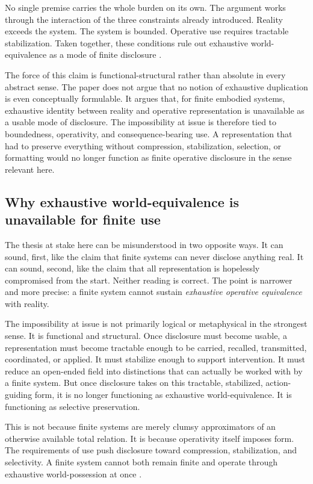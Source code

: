 \documentclass[11pt]{article}
\renewcommand{\emph}[1]{\textit{#1}}
\begin{document}
No single premise carries the whole burden on its own. The argument works through the interaction of the three constraints already introduced. Reality exceeds the system. The system is bounded. Operative use requires tractable stabilization. Taken together, these conditions rule out exhaustive world-equivalence as a mode of finite disclosure \cite{Wheeler2024BoundedRationalitySEP,ConantAshby1970GoodRegulator,Ashby1956IntroductionCybernetics}.

The force of this claim is functional-structural rather than absolute in every abstract sense. The paper does not argue that no notion of exhaustive duplication is even conceptually formulable. It argues that, for finite embodied systems, exhaustive identity between reality and operative representation is unavailable as a usable mode of disclosure. The impossibility at issue is therefore tied to boundedness, operativity, and consequence-bearing use. A representation that had to preserve everything without compression, stabilization, selection, or formatting would no longer function as finite operative disclosure in the sense relevant here.

\subsection{Why exhaustive world-equivalence is unavailable for finite use}

The thesis at stake here can be misunderstood in two opposite ways. It can sound, first, like the claim that finite systems can never disclose anything real. It can sound, second, like the claim that all representation is hopelessly compromised from the start. Neither reading is correct. The point is narrower and more precise: a finite system cannot sustain \emph{exhaustive operative equivalence} with reality.

The impossibility at issue is not primarily logical or metaphysical in the strongest sense. It is functional and structural. Once disclosure must become usable, a representation must become tractable enough to be carried, recalled, transmitted, coordinated, or applied. It must stabilize enough to support intervention. It must reduce an open-ended field into distinctions that can actually be worked with by a finite system. But once disclosure takes on this tractable, stabilized, action-guiding form, it is no longer functioning as exhaustive world-equivalence. It is functioning as selective preservation.

This is not because finite systems are merely clumsy approximators of an otherwise available total relation. It is because operativity itself imposes form. The requirements of use push disclosure toward compression, stabilization, and selectivity. A finite system cannot both remain finite and operate through exhaustive world-possession at once \cite{Simon1982ModelsBoundedRationality,ConantAshby1970GoodRegulator}.
\end{document}
